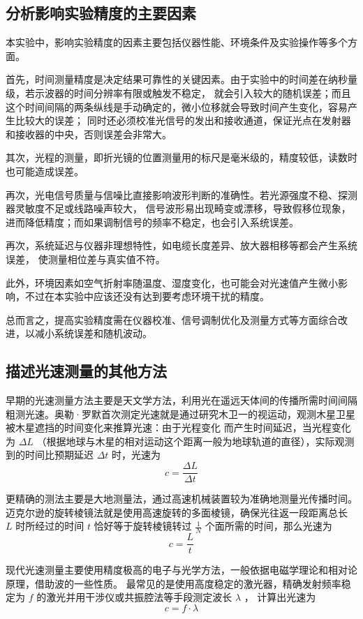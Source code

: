 \documentclass{Phyport}
\begin{document}
\subsection{分析影响实验精度的主要因素}

本实验中，影响实验精度的因素主要包括仪器性能、环境条件及实验操作等多个方面。

首先，时间测量精度是决定结果可靠性的关键因素。由于实验中的时间差在纳秒量级，若示波器的时间分辨率有限或触发不稳定，
就会引入较大的随机误差；而且这个时间间隔的两条纵线是手动确定的，微小位移就会导致时间产生变化，容易产生比较大的误差；
同时还必须校准光信号的发出和接收通道，保证光点在发射器和接收器的中央，否则误差会非常大。

其次，光程的测量，即折光镜的位置测量用的标尺是毫米级的，精度较低，读数时也可能造成误差。

再次，光电信号质量与信噪比直接影响波形判断的准确性。若光源强度不稳、探测器灵敏度不足或线路噪声较大，
信号波形易出现畸变或漂移，导致假移位现象，进而降低精度；而如果调制信号的频率不稳定，也会引入系统误差。

再次，系统延迟与仪器非理想特性，如电缆长度差异、放大器相移等都会产生系统误差，
使测量相位差与真实值不符。

此外，环境因素如空气折射率随温度、湿度变化，也可能会对光速值产生微小影响，不过在本实验中应该还没有达到要考虑环境干扰的精度。

总而言之，提高实验精度需在仪器校准、信号调制优化及测量方式等方面综合改进，以减小系统误差和随机波动。

\subsection{描述光速测量的其他方法}

早期的光速测量方法主要是天文学方法，利用光在遥远天体间的传播所需时间间隔
粗测光速。奥勒·罗默首次测定光速就是通过研究木卫一的视运动，观测木星卫星被木星遮挡的时间变化来推算光速：由于光程变化
而产生时间延迟，当光程变化为 $\Delta L$ （根据地球与木星的相对运动这个距离一般为地球轨道的直径），实际观测到的时间比预期延迟 $\Delta t$ 时，光速为
\[
c = \frac{\Delta L}{\Delta t}
\]

更精确的测法主要是大地测量法，通过高速机械装置较为准确地测量光传播时间。
迈克尔逊的旋转棱镜法就是使用高速旋转的多面棱镜，确保光往返一段距离总长 $L$ 时所经过的时间 $t$ 恰好等于旋转棱镜转过 $\frac{1}{N}$
个面所需的时间，那么光速为
\[
c =\frac{L}{t}
\]

现代光速测量主要使用精度极高的电子与光学方法，一般依据电磁学理论和相对论原理，借助波的一些性质。
最常见的是使用高度稳定的激光器，精确发射频率稳定为 $f$ 的激光并用干涉仪或共振腔法等手段测定波长 $\lambda$ ，
计算出光速为
\[
c = f \cdot \lambda
\]
\end{document}
